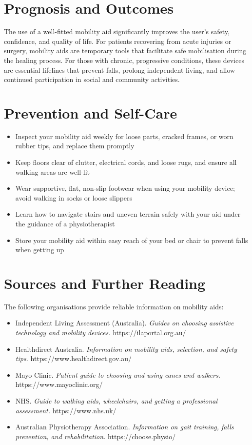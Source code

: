 \section*{Prognosis and Outcomes}
The use of a well-fitted mobility aid significantly improves the user's safety, confidence, and quality of life. For patients recovering from acute injuries or surgery, mobility aids are temporary tools that facilitate safe mobilisation during the healing process. For those with chronic, progressive conditions, these devices are essential lifelines that prevent falls, prolong independent living, and allow continued participation in social and community activities.

\section*{Prevention and Self-Care}
\begin{itemize}
    \item Inspect your mobility aid weekly for loose parts, cracked frames, or worn rubber tips, and replace them promptly
    \item Keep floors clear of clutter, electrical cords, and loose rugs, and ensure all walking areas are well-lit
    \item Wear supportive, flat, non-slip footwear when using your mobility device; avoid walking in socks or loose slippers
    \item Learn how to navigate stairs and uneven terrain safely with your aid under the guidance of a physiotherapist
    \item Store your mobility aid within easy reach of your bed or chair to prevent falls when getting up
\end{itemize}

\section*{Sources and Further Reading}
The following organisations provide reliable information on mobility aids:

\begin{itemize}
    \item Independent Living Assessment (Australia). \textit{Guides on choosing assistive technology and mobility devices.} https://ilaportal.org.au/
    \item Healthdirect Australia. \textit{Information on mobility aids, selection, and safety tips.} https://www.healthdirect.gov.au/
    \item Mayo Clinic. \textit{Patient guide to choosing and using canes and walkers.} https://www.mayoclinic.org/
    \item NHS. \textit{Guide to walking aids, wheelchairs, and getting a professional assessment.} https://www.nhs.uk/
    \item Australian Physiotherapy Association. \textit{Information on gait training, falls prevention, and rehabilitation.} https://choose.physio/
\end{itemize}
